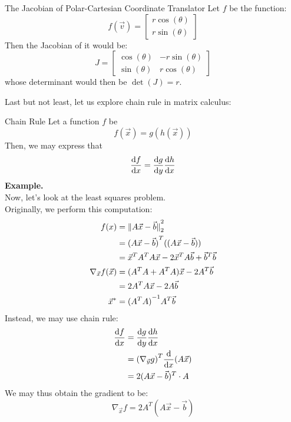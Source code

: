 \begin{ln-explain}{The Jacobian of Polar-Cartesian Coordinate Translator}{}
    Let $f$ be the function:
    \[
        f(\vec{v}) = \begin{bmatrix} r \cos(\theta) \\ r \sin(\theta) \end{bmatrix}
    \]
    Then the Jacobian of it would be:
    \[
        J =
        \begin{bmatrix}
            \cos(\theta) & -r \sin(\theta) \\
            \sin(\theta) & r \cos(\theta)
        \end{bmatrix}
    \]
    whose determinant would then be $\det(J) = r$.
\end{ln-explain}

Last but not least, let us explore chain rule in matrix calculus:
\begin{ln-define}{Chain Rule}{}
    Let a function $f$ be
    \[
        f(\vec{x}) = g(h(\vec{x}))
    \]
    Then, we may express that
    \[
        \dv{f}{x} = \dv{g}{y} \dv{h}{x}
    \]
    \tcblower
    \textbf{Example.} \\
    Now, let's look at the least squares problem. \\
    Originally, we perform this computation:
    \begin{align*}
        f(x)
        &= \pnorm[2]{A \vec{x} - \vec{b}}{2} \\
        &= {(A \vec{x} - \vec{b})}^T ((A \vec{x} - \vec{b})) \\
        &= \vec{x}^T A^T A \vec{x} - 2 \vec{x}^T A \vec{b} + \vec{b}^T \vec{b} \\
        \nabla_{\vec{x}} f(\vec{x})
        &= (A^T A + A^T A) \vec{x} - 2 A^T \vec{b} \\
        &= 2 A^T A \vec{x} - 2 A \vec{b} \\
        \vec{x}^* &= {(A^T A)}^{-1} A^T \vec{b}
    \end{align*}
    Instead, we may use chain rule:
    \begin{align*}
        \dv{f}{x}
        &= \dv{g}{y} \dv{h}{x} \\
        &= {(\nabla_{\vec{y}} g)}^T \dv{}{x} {} (A \vec{x}) \\
        &= 2(A \vec{x} - \vec{b})^T \cdot A
    \end{align*}
    We may thus obtain the gradient to be:
    \[
        \nabla_{\vec{x}} f = 2 A^T (A \vec{x} - \vec{b})
    \]
\end{ln-define}
